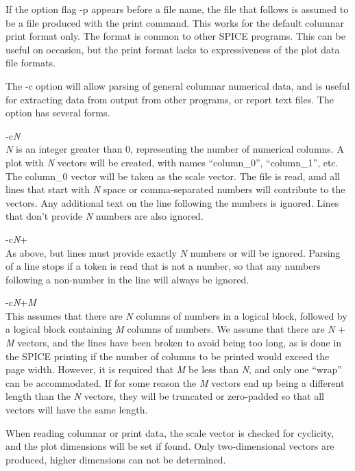 If the option flag {\vt -p} appears before a file name, the file that
follows is assumed to be a file produced with the {\WRspice} {\cb
print} command.  This works for the default columnar print format
only.  The format is common to other SPICE programs.  This can be
useful on occasion, but the print format lacks to expressiveness of
the plot data file formats.

The {\vt -c} option will allow parsing of general columnar numerical
data, and is useful for extracting data from output from other
programs, or report text files.  The option has several forms.

\begin{description}
\item{\vt -c}{\it N}\\
{\it N} is an integer greater than 0, representing the number of
numerical columns.  A plot with {\it N} vectors will be created,
with names ``{\vt column\_0}'', ``{\vt column\_1}'', etc.  The
{\vt column\_0} vector will be taken as the scale vector.  The file is
read, amd all lines that start with {\it N} space or comma-separated
numbers will contribute to the vectors.  Any additional text on the
line following the numbers is ignored.  Lines that don't provide
{\it N} numbers are also ignored.

\item{\vt -c}{\it N\/}{\vt +}\\
As above, but lines must provide exactly {\it N} numbers or will
be ignored.  Parsing of a line stops if a token is read that is
not a number, so that any numbers following a non-number in the
line will always be ignored.

\item{-c}{\it N\/}{\vt +}{\it M}\\
This assumes that there are {\it N} columns of numbers in a logical
block, followed by a logical block containing {\it M} columns of
numbers.  We assume that there are {\it N} + {\it M} vectors, and the
lines have been broken to avoid being too long, as is done in the
SPICE printing if the number of columns to be printed would exceed the
page width.  However, it is required that {\it M} be less than {\it
N}, and only one ``wrap'' can be accommodated.  If for some reason the
{\it M} vectors end up being a different length than the {\it N}
vectors, they will be truncated or zero-padded so that all vectors
will have the same length.
\end{description}

When reading columnar or print data, the scale vector is checked for
cyclicity, and the plot dimensions will be set if found.  Only
two-dimensional vectors are produced, higher dimensions can not be
determined.

